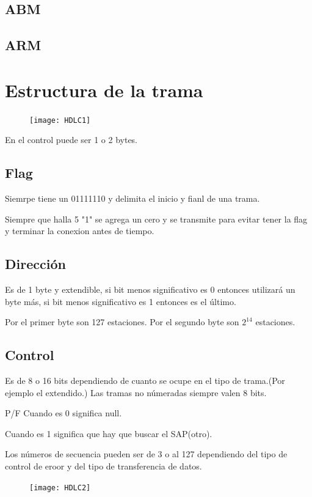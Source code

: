 \documentclass[12pt, fleqn]{report}                             %
\theoremstyle{break}                                            %
\begin{document}
            \subsection{ABM}
            \subsection{ARM}

            \section{Estructura de la trama}
        \begin{figure}[ht]
                \centering
                \texttt{[image: HDLC1]}
            \end{figure}
            En el control puede ser 1 o 2 bytes.

           \subsection{Flag} Siemrpe tiene un 01111110 y delimita el inicio y fianl de una trama.

            Siempre que halla 5 "1" se agrega un cero y se transmite para evitar tener la flag y terminar la conexion antes de tiempo.

            \subsection{Dirección} Es de 1 byte y extendible, si bit menos significativo es 0 entonces utilizará un byte más, si bit menos significativo es 1 entonces es el último.

            Por el primer byte son 127 estaciones.
            Por el segundo byte son $2^14$ estaciones.

            \subsection{Control}

            Es de 8 o 16 bits dependiendo de cuanto se ocupe en el tipo de trama.(Por ejemplo el extendido.)
            Las tramas no númeradas siempre valen 8 bits.

            P/F Cuando es 0 significa null.

            Cuando es 1 significa que hay que buscar el SAP(otro).

            Los números de secuencia pueden ser de 3 o al 127 dependiendo del tipo de control de eroor y del tipo de transferencia de datos.
                    \begin{figure}[ht]
                \centering
                \texttt{[image: HDLC2]}
            \end{figure}
\end{document}

